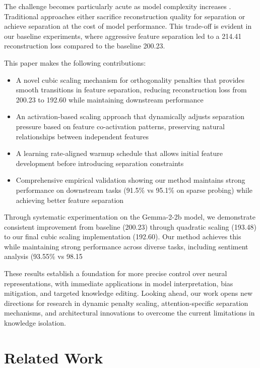 \documentclass{article} %
\begin{document}
The challenge becomes particularly acute as model complexity increases \cite{vaswani2017attention}. Traditional approaches either sacrifice reconstruction quality for separation or achieve separation at the cost of model performance. This trade-off is evident in our baseline experiments, where aggressive feature separation led to a 214.41 reconstruction loss compared to the baseline 200.23.

This paper makes the following contributions:

\begin{itemize}
    \item A novel cubic scaling mechanism for orthogonality penalties that provides smooth transitions in feature separation, reducing reconstruction loss from 200.23 to 192.60 while maintaining downstream performance
    \item An activation-based scaling approach that dynamically adjusts separation pressure based on feature co-activation patterns, preserving natural relationships between independent features
    \item A learning rate-aligned warmup schedule that allows initial feature development before introducing separation constraints
    \item Comprehensive empirical validation showing our method maintains strong performance on downstream tasks (91.5\% vs 95.1\% on sparse probing) while achieving better feature separation
\end{itemize}

Through systematic experimentation on the Gemma-2-2b model, we demonstrate consistent improvement from baseline (200.23) through quadratic scaling (193.48) to our final cubic scaling implementation (192.60). Our method achieves this while maintaining strong performance across diverse tasks, including sentiment analysis (93.55\% vs 98.15%

These results establish a foundation for more precise control over neural representations, with immediate applications in model interpretation, bias mitigation, and targeted knowledge editing. Looking ahead, our work opens new directions for research in dynamic penalty scaling, attention-specific separation mechanisms, and architectural innovations to overcome the current limitations in knowledge isolation.

\section{Related Work}
\label{sec:related}
\end{document}
